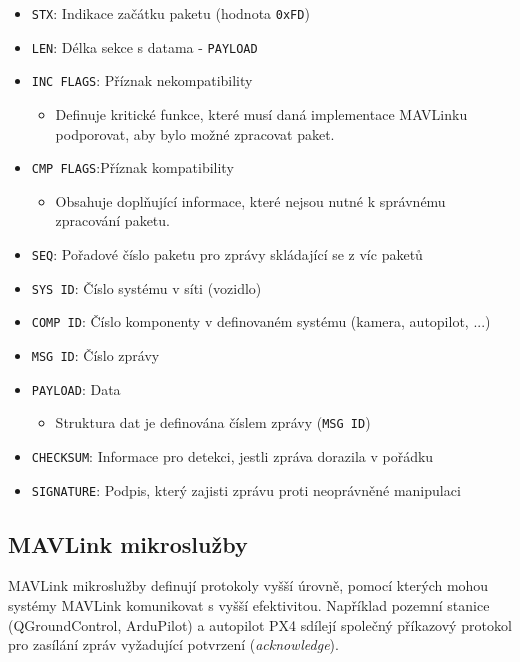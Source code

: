 \begin{itemize}
    \item \texttt{STX}: Indikace začátku paketu (hodnota \texttt{0xFD})
    \item \texttt{LEN}: Délka sekce s datama - \texttt{PAYLOAD}
    \item \texttt{INC FLAGS}: Příznak nekompatibility
    \begin{itemize}
        \item Definuje kritické funkce, které musí daná implementace MAVLinku podporovat, aby bylo možné zpracovat paket.
    \end{itemize}
    \item \texttt{CMP FLAGS}:Příznak kompatibility
    \begin{itemize}
        \item Obsahuje doplňující informace, které nejsou nutné k správnému zpracování paketu.
    \end{itemize}
    \item \texttt{SEQ}: Pořadové číslo paketu pro zprávy skládající se z víc paketů
    \item \texttt{SYS ID}: Číslo systému v síti (vozidlo)
    \item \texttt{COMP ID}: Číslo komponenty v definovaném systému (kamera, autopilot, ...)
    \item \texttt{MSG ID}: Číslo zprávy
    \item \texttt{PAYLOAD}: Data
    \begin{itemize}
        \item Struktura dat je definována číslem zprávy (\texttt{MSG ID})
    \end{itemize}
    \item \texttt{CHECKSUM}: Informace pro detekci, jestli zpráva dorazila v pořádku
    \item \texttt{SIGNATURE}: Podpis, který zajisti zprávu proti neoprávněné manipulaci
\end{itemize}

\subsection{MAVLink mikroslužby}

MAVLink mikroslužby definují protokoly vyšší úrovně, pomocí kterých mohou systémy MAVLink komunikovat s vyšší efektivitou. Například pozemní stanice (QGroundControl, ArduPilot) a autopilot PX4 sdílejí společný příkazový protokol pro zasílání zpráv vyžadující potvrzení (\textit{acknowledge}).

